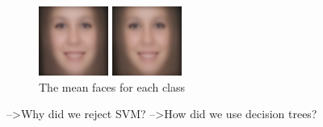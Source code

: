 \documentclass[10pt,twocolumn,letterpaper]{article}
\begin{document}
\begin {figure} [h]
\begin {minipage}{0.22\textwidth}
    \end{minipage}
    \begin {minipage}{0.22\textwidth}
        \includegraphics[width = \linewidth]{mean_2.png}
    \end {minipage}
    \begin {minipage}{0.22\textwidth}
        \includegraphics[width = \linewidth]{mean_3.png}
    \end{minipage}
    \label{fig:mean_faces}
    \caption{The mean faces for each class}
\end {figure}

-->Why did we reject SVM?
-->How did we use decision trees?

\cite{turk1991eigenfaces, belhumeur1997eigenfaces, yang2002kernel, guo2000face, eisenthal2006facial, }


{\small


}
\end{document}
